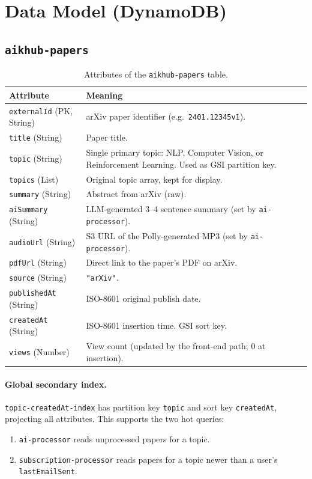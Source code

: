 \documentclass[11pt,a4paper]{article}
\begin{document}
\section{Data Model (DynamoDB)}

\subsection{\texttt{aikhub-papers}}

\begin{table}[h]
\centering
\begin{tabularx}{\linewidth}{lX}
\toprule
\textbf{Attribute} & \textbf{Meaning} \\
\midrule
\texttt{externalId} (PK, String) & arXiv paper identifier (e.g.\ \texttt{2401.12345v1}). \\
\texttt{title} (String)          & Paper title. \\
\texttt{topic} (String)          & Single primary topic: NLP, Computer Vision, or Reinforcement Learning. Used as GSI partition key. \\
\texttt{topics} (List)           & Original topic array, kept for display. \\
\texttt{summary} (String)        & Abstract from arXiv (raw). \\
\texttt{aiSummary} (String)      & LLM-generated 3--4 sentence summary (set by \texttt{ai-processor}). \\
\texttt{audioUrl} (String)       & S3 URL of the Polly-generated MP3 (set by \texttt{ai-processor}). \\
\texttt{pdfUrl} (String)         & Direct link to the paper's PDF on arXiv. \\
\texttt{source} (String)         & \texttt{"arXiv"}. \\
\texttt{publishedAt} (String)    & ISO-8601 original publish date. \\
\texttt{createdAt} (String)      & ISO-8601 insertion time. GSI sort key. \\
\texttt{views} (Number)          & View count (updated by the front-end path; 0 at insertion). \\
\bottomrule
\end{tabularx}
\caption{Attributes of the \texttt{aikhub-papers} table.}
\end{table}

\paragraph{Global secondary index.} \texttt{topic-createdAt-index} has partition key \texttt{topic} and sort key \texttt{createdAt}, projecting all attributes. This supports the two hot queries:
\begin{enumerate}[leftmargin=*]
  \item \texttt{ai-processor} reads unprocessed papers for a topic.
  \item \texttt{subscription-processor} reads papers for a topic newer than a user's \texttt{lastEmailSent}.
\end{enumerate}
\end{document}
